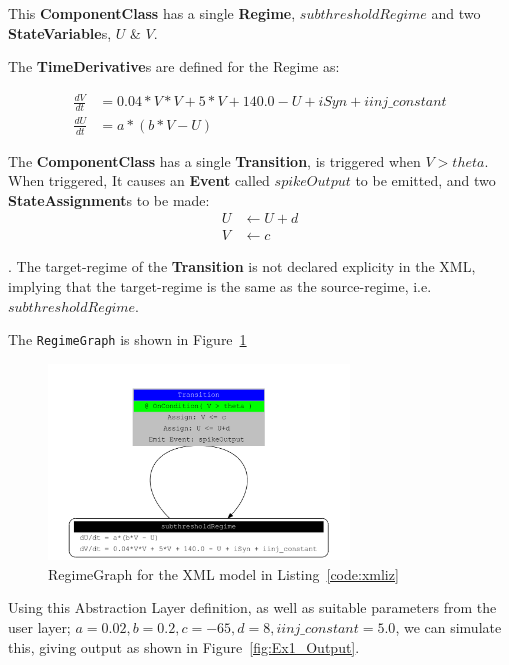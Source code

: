 \documentclass{article}
\newcommand{\ComponentClass}{{\bf{ComponentClass}}\xspace}
\newcommand{\StateVariables}{{\bf{StateVariable}}s\xspace}
\newcommand{\StateAssignments}{{\bf{StateAssignment}}s\xspace}
\newcommand{\TimeDerivatives}{{\bf{TimeDerivative}}s\xspace}
\newcommand{\Event}{{\bf{Event}}\xspace}
\newcommand{\Regime}{{\bf{Regime}}\xspace}
\newcommand{\Transition}{{\bf{Transition}}\xspace}
\begin{document}
\newpage

\noindent
This \ComponentClass has a single \Regime, $subthresholdRegime$ and two
\StateVariables, $U$ \& $V$. 

\noindent
The \TimeDerivatives are defined for the Regime as:

\begin{align}
\frac{dV}{dt} &= 0.04*V*V + 5*V + 140.0 - U + iSyn + iinj\_constant   \\
\frac{dU}{dt} &= a * ( b* V -U )
\end{align}

The \ComponentClass has a single \Transition, is triggered when $V>theta$. When
triggered, It causes an \Event called $spikeOutput$ to be emitted, and two
\StateAssignments to be made:
\begin{align}
U &\leftarrow U + d \\
V &\leftarrow c
\end{align}

. The target-regime of the
\Transition is not declared explicity in the XML, implying that the
target-regime is the same as the source-regime, i.e. $subthresholdRegime$.

The {\tt RegimeGraph} is shown in Figure~\ref{fig:EX1_RegimeGraph}

\begin{figure}[htb!]
\center
\includegraphics[width=8cm]{figures/example_IzRegimeTransGraph.pdf}
\protect\caption{RegimeGraph for the XML model in Listing~\ref{code:xmliz}}
\label{fig:EX1_RegimeGraph}
\end{figure}


Using this Abstraction Layer definition, as well as suitable parameters from the
user layer; $a=0.02, b=0.2, c=-65, d= 8, iinj\_constant= 5.0$, we can simulate
this, giving output as shown in Figure~\ref{fig:Ex1_Output}.
\end{document}
